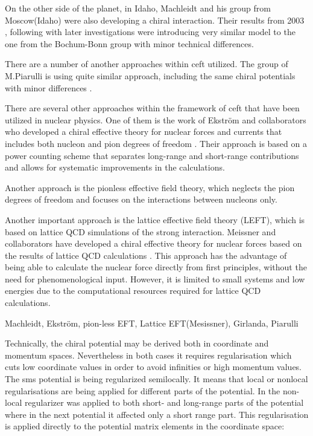 On the other side of the planet, in Idaho, Machleidt and his group from Moscow(Idaho) were also developing 
a chiral interaction. Their results from 2003 \cite{Entem2003}, following with later 
investigations \cite{Machleidt2005, Machleidt2010, Entem2017} were introducing very similar model
to the one from the Bochum-Bonn
group with minor technical differences.

There are a number of another approaches within \gls{ceft} utilized.
The group of M.Piarulli is using quite similar approach, including
the same chiral potentials with minor differences \cite{Piarulli2012,Piarulli2015}.

There are several other approaches within the framework of \gls{ceft}
that have been utilized in nuclear physics.
One of them is the work of Ekström and collaborators who developed a chiral
effective theory for nuclear forces and currents that includes both
nucleon and pion degrees of freedom \cite{ekstrom_2015, Tews_2020}. Their approach
is based on a power counting scheme that separates long-range and
short-range contributions and allows for systematic improvements in the
calculations.

Another approach is the pionless effective field
theory, which neglects the pion degrees of freedom and
focuses on the interactions between nucleons only\cite{?}.

Another important approach is the lattice effective field theory (LEFT), which
is based on lattice QCD simulations of the strong
interaction. Meissner and collaborators have developed a chiral effective
theory for nuclear forces based on the results of lattice QCD
calculations \cite{?}. This approach has the advantage of being able
to calculate the nuclear force directly from first
principles, without the need for phenomenological input. However, it is limited
to small systems and low energies due to the computational
resources required for lattice QCD calculations.


{\color{red} Machleidt, Ekstr\"om, pion-less EFT, Lattice EFT(Mesissner), Girlanda, Piarulli}


Technically, the chiral potential may be derived both in coordinate and momentum spaces.
Nevertheless in both cases it requires regularisation which cuts 
low coordinate values in order to avoid infinities 
or high momentum values. 
The \gls{sms} potential is being regularized semilocally. 
It means that  local or nonlocal regularisations
are being applied for different parts of the potential.
In \cite{Entem2003, epelbaum2005two} the non-local regularizer was applied to both short- and long-range parts
 of the potential where in the next \cite{Entem2017, Epelbaum2014SCS} potential
 it affected only a short range part. 
This regularisation is applied directly to the potential matrix elements 
in the coordinate space:

